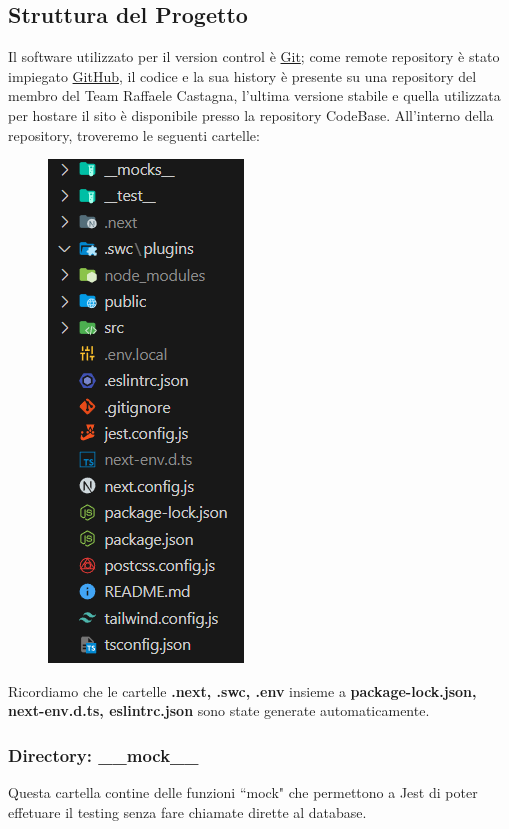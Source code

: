 \documentclass[11pt, a4paper]{article}
\theoremstyle{definition}
\begin{document}
\subsection{Struttura del Progetto}
Il software utilizzato per il version control è \href{https://git-scm.com/}{Git}; come remote repository è stato impiegato \href{www.github.com}{GitHub},
il codice e la sua history è presente su una repository del membro del Team Raffaele Castagna, l'ultima versione stabile e quella utilizzata per hostare il sito è disponibile presso la repository CodeBase. All'interno della repository,
troveremo le seguenti cartelle:

\begin{figure}[H]
\centering
\includegraphics[scale = 1.2]{materiale/Project Structure.png}
\end{figure}

\noindent Ricordiamo che le cartelle \textbf{.next, .swc, .env} insieme a \textbf{package-lock.json, next-env.d.ts, eslintrc.json} sono state generate automaticamente.

\newpage
\subsubsection{Directory: \_\_mock\_\_ }
Questa cartella contine delle funzioni ``mock" che permettono a Jest di poter effetuare il testing senza fare chiamate dirette al database.
\end{document}
